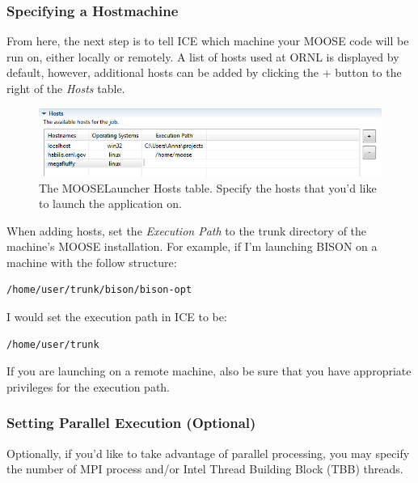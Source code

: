 \subsubsection{Specifying a Hostmachine}\label{specifying-a-hostmachine}

From here, the next step is to tell ICE which machine your MOOSE code
will be run on, either locally or remotely. A list of hosts used at ORNL
is displayed by default, however, additional hosts can be added by
clicking the + button to the right of the \emph{Hosts} table.

\begin{figure}[htbp]
\centering
\includegraphics[width=\textwidth]{figures/ICE_MOOSEHostsTable.png}
\caption{The MOOSELauncher Hosts table. Specify the hosts that you'd like to launch the application on.}
\end{figure}

When adding hosts, set the \emph{Execution Path} to the trunk directory
of the machine's MOOSE installation. For example, if I'm launching BISON
on a machine with the follow structure:

\begin{verbatim}
/home/user/trunk/bison/bison-opt
\end{verbatim}

I would set the execution path in ICE to be:

\begin{verbatim}
/home/user/trunk
\end{verbatim}

If you are launching on a remote machine, also be sure that you have
appropriate privileges for the execution path.

\subsubsection{Setting Parallel Execution
(Optional)}\label{setting-parallel-execution-optional}

Optionally, if you'd like to take advantage of parallel processing, you
may specify the number of MPI process and/or Intel Thread Building Block
(TBB) threads.

